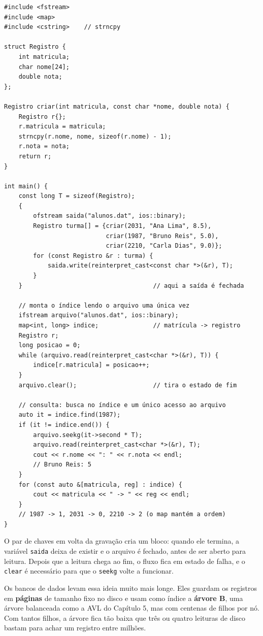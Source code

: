 \begin{codigo}
\begin{Verbatim}[breaklines=true, breaksymbolleft={}, fontsize=\footnotesize]
#include <fstream>
#include <map>
#include <cstring>    // strncpy

struct Registro {
    int matricula;
    char nome[24];
    double nota;
};

Registro criar(int matricula, const char *nome, double nota) {
    Registro r{};
    r.matricula = matricula;
    strncpy(r.nome, nome, sizeof(r.nome) - 1);
    r.nota = nota;
    return r;
}

int main() {
    const long T = sizeof(Registro);
    {
        ofstream saida("alunos.dat", ios::binary);
        Registro turma[] = {criar(2031, "Ana Lima", 8.5),
                            criar(1987, "Bruno Reis", 5.0),
                            criar(2210, "Carla Dias", 9.0)};
        for (const Registro &r : turma) {
            saida.write(reinterpret_cast<const char *>(&r), T);
        }
    }                                    // aqui a saída é fechada

    // monta o índice lendo o arquivo uma única vez
    ifstream arquivo("alunos.dat", ios::binary);
    map<int, long> indice;               // matrícula -> registro
    Registro r;
    long posicao = 0;
    while (arquivo.read(reinterpret_cast<char *>(&r), T)) {
        indice[r.matricula] = posicao++;
    }
    arquivo.clear();                     // tira o estado de fim

    // consulta: busca no índice e um único acesso ao arquivo
    auto it = indice.find(1987);
    if (it != indice.end()) {
        arquivo.seekg(it->second * T);
        arquivo.read(reinterpret_cast<char *>(&r), T);
        cout << r.nome << ": " << r.nota << endl;
        // Bruno Reis: 5
    }
    for (const auto &[matricula, reg] : indice) {
        cout << matricula << " -> " << reg << endl;
    }
    // 1987 -> 1, 2031 -> 0, 2210 -> 2 (o map mantém a ordem)
}
\end{Verbatim}
\end{codigo}

O par de chaves em volta da gravação cria um bloco: quando ele termina, a variável \texttt{saida} deixa de existir e o arquivo é fechado, antes de ser aberto para leitura. Depois que a leitura chega ao fim, o fluxo fica em estado de falha, e o \texttt{clear} é necessário para que o \texttt{seekg} volte a funcionar.

Os bancos de dados levam essa ideia muito mais longe. Eles guardam os registros em \textbf{páginas} de tamanho fixo no disco e usam como índice a \textbf{árvore B}, uma árvore balanceada como a AVL do Capítulo 5, mas com centenas de filhos por nó. Com tantos filhos, a árvore fica tão baixa que três ou quatro leituras de disco bastam para achar um registro entre milhões.

